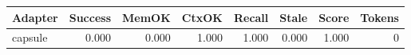 \begin{tabular}{lrrrrrrr}
\hline
Adapter & Success & MemOK & CtxOK & Recall & Stale & Score & Tokens \\
\hline
capsule & 0.000 & 0.000 & 1.000 & 1.000 & 0.000 & 1.000 & 0 \\
\hline
\end{tabular}
